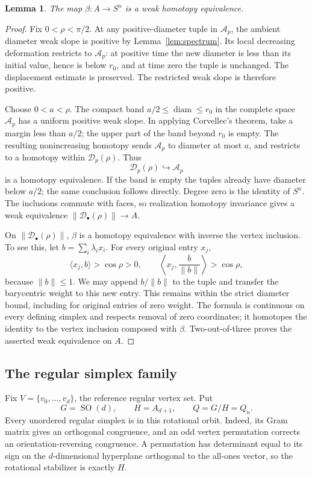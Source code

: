 \documentclass[11pt,a4paper]{article}
\newtheorem{lemma}[theorem]{Lemma}
\theoremstyle{definition}
\DeclareMathOperator{\diam}{diam}
\DeclareMathOperator{\SO}{SO}
\newcommand{\fat}[1]{\lVert #1\rVert}
\newcommand{\Dconf}{\mathcal D}
\newcommand{\Aconf}{\mathcal A}
\begin{document}
\begin{lemma}\label{lem:noncritical}
The map \(\beta:A\to S^n\) is a weak homotopy equivalence.
\end{lemma}
\begin{proof}
Fix \(0<\rho<\pi/2\). At any positive-diameter tuple in \(\Aconf_p\), the ambient diameter weak slope is positive by Lemma~\ref{lem:spectrum}. Its local decreasing deformation restricts to \(\Aconf_p\): at positive time the new diameter is less than its initial value, hence is below \(r_0\), and at time zero the tuple is unchanged. The displacement estimate is preserved. The restricted weak slope is therefore positive.

Choose \(0<a<\rho\). The compact band
\(a/2\leq\diam\leq r_0\) in the complete space \(\Aconf_p\) has a uniform positive weak slope. In applying Corvellec's theorem, take a margin less than \(a/2\); the upper part of the band beyond \(r_0\) is empty. The resulting nonincreasing homotopy sends \(\Aconf_p\) to diameter at most \(a\), and restricts to a homotopy within \(\Dconf_p(\rho)\). Thus
\[
\Dconf_p(\rho)\hookrightarrow\Aconf_p
\]
is a homotopy equivalence. If the band is empty the tuples already have diameter below \(a/2\); the same conclusion follows directly. Degree zero is the identity of \(S^n\).
The inclusions commute with faces, so realization homotopy invariance \cite[Theorem~2.2]{ERW} gives a weak equivalence
\(\fat{\Dconf_\bullet(\rho)}\to A\).

On \(\fat{\Dconf_\bullet(\rho)}\), \(\beta\) is a homotopy equivalence with inverse the vertex inclusion. To see this, let \(b=\sum_i\lambda_i x_i\). For every original entry \(x_j\),
\[
\langle x_j,b\rangle>\cos\rho>0,\qquad
\left\langle x_j,\frac b{\|b\|}\right\rangle>\cos\rho,
\]
because \(\|b\|\leq1\). We may append \(b/\|b\|\) to the tuple and transfer the barycentric weight to this new entry. This remains within the strict diameter bound, including for original entries of zero weight. The formula is continuous on every defining simplex and respects removal of zero coordinates; it homotopes the identity to the vertex inclusion composed with \(\beta\).
Two-out-of-three proves the asserted weak equivalence on \(A\).
\end{proof}

\subsection{The regular simplex family}
Fix \(V=\{v_0,\ldots,v_d\}\), the reference regular vertex set. Put
\[
G=\SO(d),\qquad H=A_{d+1},\qquad Q=G/H=Q_n.
\]
Every unordered regular simplex is in this rotational orbit. Indeed, its Gram matrix gives an orthogonal congruence, and an odd vertex permutation corrects an orientation-reversing congruence. A permutation has determinant equal to its sign on the \(d\)-dimensional hyperplane orthogonal to the all-ones vector, so the rotational stabilizer is exactly \(H\).
\end{document}
